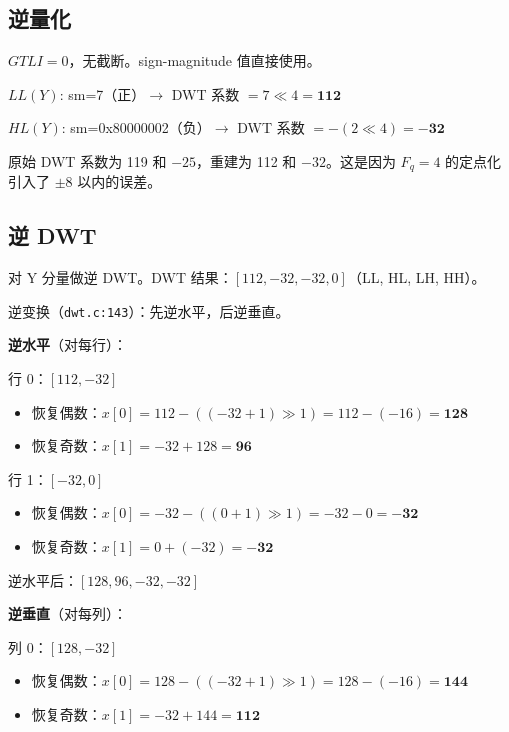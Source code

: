 \subsection{逆量化}

$\mathit{GTLI}=0$，无截断。sign-magnitude 值直接使用。

$\mathit{LL(Y)}$: sm=7（正）$\to$ DWT 系数 $= 7 \ll 4 = \mathbf{112}$

$\mathit{HL(Y)}$: sm=0x80000002（负）$\to$ DWT 系数 $= -(2 \ll 4) = \mathbf{-32}$

\begin{tcolorbox}[colback=yellow!5,colframe=yellow!60!black,title=精度损失]
原始 DWT 系数为 119 和 $-25$，重建为 112 和 $-32$。这是因为 $F_q = 4$ 的定点化引入了 $\pm 8$ 以内的误差。
\end{tcolorbox}

\subsection{逆 DWT}

对 Y 分量做逆 DWT。DWT 结果：$[112, -32, -32, 0]$（LL, HL, LH, HH）。

逆变换（\texttt{dwt.c:143}）：先逆水平，后逆垂直。

\textbf{逆水平}（对每行）：

行 0：$[112, -32]$
\begin{itemize}
  \item 恢复偶数：$x[0] = 112 - ((-32+1)\gg1) = 112 - (-16) = \mathbf{128}$
  \item 恢复奇数：$x[1] = -32 + 128 = \mathbf{96}$
\end{itemize}

行 1：$[-32, 0]$
\begin{itemize}
  \item 恢复偶数：$x[0] = -32 - ((0+1)\gg1) = -32 - 0 = \mathbf{-32}$
  \item 恢复奇数：$x[1] = 0 + (-32) = \mathbf{-32}$
\end{itemize}

逆水平后：$[128, 96, -32, -32]$

\textbf{逆垂直}（对每列）：

列 0：$[128, -32]$
\begin{itemize}
  \item 恢复偶数：$x[0] = 128 - ((-32+1)\gg1) = 128 - (-16) = \mathbf{144}$
  \item 恢复奇数：$x[1] = -32 + 144 = \mathbf{112}$
\end{itemize}

